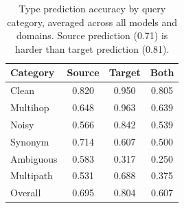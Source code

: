 \begin{table}[t]
\centering
\small
\begin{tabular}{l ccc}
\toprule
\textbf{Category} & \textbf{Source} & \textbf{Target} & \textbf{Both} \\
\midrule
Clean & 0.820 & 0.950 & 0.805 \\
Multihop & 0.648 & 0.963 & 0.639 \\
Noisy & 0.566 & 0.842 & 0.539 \\
Synonym & 0.714 & 0.607 & 0.500 \\
Ambiguous & 0.583 & 0.317 & 0.250 \\
Multipath & 0.531 & 0.688 & 0.375 \\
\midrule
Overall & 0.695 & 0.804 & 0.607 \\
\bottomrule
\end{tabular}
\caption{Type prediction accuracy by query category, averaged across all models and domains. Source prediction (0.71) is harder than target prediction (0.81).}
\label{tab:type-prediction}
\end{table}